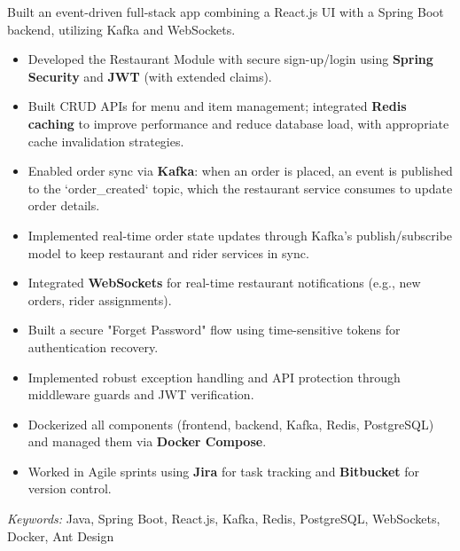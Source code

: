\nointent
{}

\nointent
Built an event-driven full-stack app combining a React.js UI with a Spring Boot backend, utilizing Kafka and WebSockets.

\begin{itemize}
    \item Developed the Restaurant Module with secure sign-up/login using \textbf{Spring Security} and \textbf{JWT} (with extended claims).
    \item Built CRUD APIs for menu and item management; integrated \textbf{Redis caching} to improve performance and reduce database load, with appropriate cache invalidation strategies.
    \item Enabled order sync via \textbf{Kafka}: when an order is placed, an event is published to the `order\_created` topic, which the restaurant service consumes to update order details.
    \item Implemented real-time order state updates through Kafka's publish/subscribe model to keep restaurant and rider services in sync.
    \item Integrated \textbf{WebSockets} for real-time restaurant notifications (e.g., new orders, rider assignments).
    \item Built a secure "Forget Password" flow using time-sensitive tokens for authentication recovery.
    \item Implemented robust exception handling and API protection through middleware guards and JWT verification.
    \item Dockerized all components (frontend, backend, Kafka, Redis, PostgreSQL) and managed them via \textbf{Docker Compose}.
    \item Worked in Agile sprints using \textbf{Jira} for task tracking and \textbf{Bitbucket} for version control.
\end{itemize}

\nointent
\textit{Keywords:} Java, Spring Boot, React.js, Kafka, Redis, PostgreSQL, WebSockets, Docker, Ant Design

\vspace{1em}